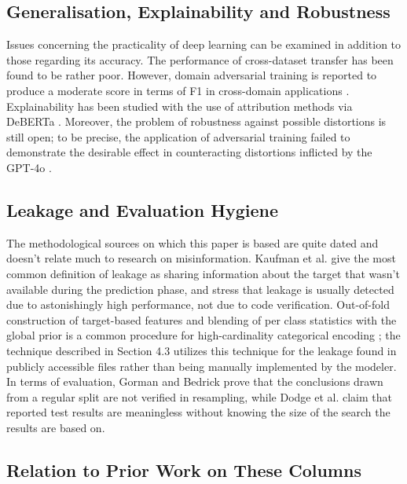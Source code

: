 \documentclass[10pt,twocolumn,twoside,a4paper]{article}
\begin{document}
\subsection{Generalisation, Explainability and Robustness}

Issues concerning the practicality of deep learning can be examined in addition to those regarding its accuracy. The performance of cross-dataset transfer has been found to be rather poor. However, domain adversarial training is reported to produce a moderate score in terms of F1 in cross-domain applications \cite{patel2025cross}. Explainability has been studied with the use of attribution methods via DeBERTa \cite{nguyen2025explaining}. Moreover, the problem of robustness against possible distortions is still open; to be precise, the application of adversarial training failed to demonstrate the desirable effect in counteracting distortions inflicted by the GPT-4o \cite{almansoori2025adversarial}.

\subsection{Leakage and Evaluation Hygiene}

The methodological sources on which this paper is based are quite dated and doesn't relate much to research on misinformation. Kaufman et al. \cite{kaufman2012leakage} give the most common definition of leakage as sharing information about the target that wasn't available during the prediction phase, and stress that leakage is usually detected due to astonishingly high performance, not due to code verification. Out-of-fold construction of target-based features and blending of per class statistics with the global prior is a common procedure for high-cardinality categorical encoding \cite{miccibarreca2001preprocessing}; the technique described in Section 4.3 utilizes this technique for the leakage found in publicly accessible files rather than being manually implemented by the modeler. In terms of evaluation, Gorman and Bedrick \cite{gorman2019standard} prove that the conclusions drawn from a regular split are not verified in resampling, while Dodge et al. \cite{dodge2019show} claim that reported test results are meaningless without knowing the size of the search the results are based on.

\subsection{Relation to Prior Work on These Columns}
\end{document}
